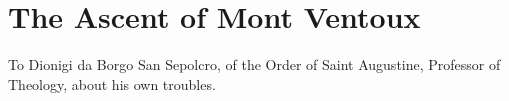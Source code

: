 
\author{Francesco Petrarca (Petrarch)}
\chapter{The Ascent of Mont Ventoux}

\begin{abstract}{i} Letter to Francesco Dionigi de'Roberti of
Borgo San Sepolcro, professor of theology in Paris. Malauc\`{e}ne,
April 26, 1336. (\textit{Fam}., IV, 1, in \textit{Le Familiari}, ed.
V. Rossi, I, 153--61; \textit{Opera} [Basel, 1581], pp. 624--27.)
\end{abstract}

\begin{center} To Dionigi da Borgo San Sepolcro, of the Order of Saint
Augustine, Professor of Theology, about his own troubles. \end{center}

